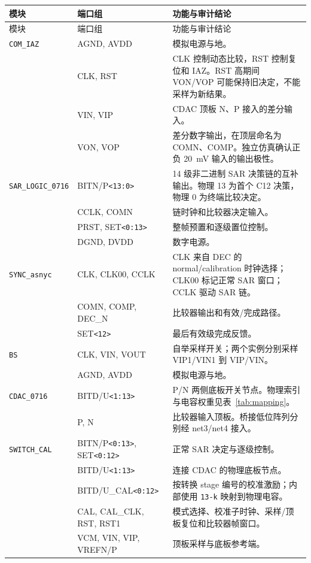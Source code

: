 \documentclass[UTF8,a4paper,11pt]{ctexart}
\newcommand{\code}[1]{\texttt{#1}}
\begin{document}
\begin{longtable}{p{}p{}p{}}
\toprule
模块 & 端口组 & 功能与审计结论 \\
\midrule
\endfirsthead
\toprule
模块 & 端口组 & 功能与审计结论 \\
\midrule
\endhead
\code{COM\_IAZ} & AGND, AVDD & 模拟电源与地。 \\
 & CLK, RST & CLK 控制动态比较，RST 控制复位和 IAZ。RST 高期间 VON/VOP 可能保持旧决定，不能采样为新结果。 \\
 & VIN, VIP & CDAC 顶板 N、P 接入的差分输入。 \\
 & VON, VOP & 差分数字输出，在顶层命名为 COMN、COMP。独立仿真确认正负 \SI{20}{mV} 输入的输出极性。 \\
\midrule
\code{SAR\_LOGIC\_0716} & BITN/P\code{<13:0>} & 14 级非二进制 SAR 决策链的互补输出。物理 13 为首个 C12 决策，物理 0 为终端比较决定。 \\
 & CCLK, COMN & 链时钟和比较器决定输入。 \\
 & PRST, SET\code{<0:13>} & 整帧预置和逐级置位控制。 \\
 & DGND, DVDD & 数字电源。 \\
\midrule
\code{SYNC\_asnyc} & CLK, CLK00, CCLK & CLK 来自 DEC 的 normal/calibration 时钟选择；CLK00 标记正常 SAR 窗口；CCLK 驱动 SAR 链。 \\
 & COMN, COMP, DEC\_N & 比较器输出和有效/完成路径。 \\
 & SET\code{<12>} & 最后有效级完成反馈。 \\
\midrule
\code{BS} & CLK, VIN, VOUT & 自举采样开关；两个实例分别采样 VIP1/VIN1 到 VIP/VIN。 \\
 & AGND, AVDD & 模拟电源与地。 \\
\midrule
\code{CDAC\_0716} & BITD/U\code{<1:13>} & P/N 两侧底板开关节点。物理索引与电容权重见表~\ref{tab:mapping}。 \\
 & P, N & 比较器输入顶板。桥接低位阵列分别经 net3/net4 接入。 \\
\midrule
\code{SWITCH\_CAL} & BITN/P\code{<0:13>}, SET\code{<0:12>} & 正常 SAR 决定与逐级控制。 \\
 & BITD/U\code{<1:13>} & 连接 CDAC 的物理底板节点。 \\
 & BITD/U\_CAL\code{<0:12>} & 按转换 stage 编号的校准激励；内部使用 \code{13-k} 映射到物理电容。 \\
 & CAL, CAL\_CLK, RST, RST1 & 模式选择、校准子时钟、采样/顶板复位和比较器帧窗口。 \\
 & VCM, VIN, VIP, VREFN/P & 顶板采样与底板参考端。 \\

\end{longtable}
\end{document}
